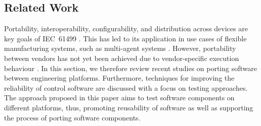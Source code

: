 \begin{bibunit}
\section{Related Work}
\label{sec::sota}

Portability, interoperability, configurability, and distribution across devices are key goals of IEC~61499 \cite{jhunjhunwala2024interoperability,hopsu2019portability, batchkova2013dynamic}. 
This has led to its application in use cases of flexible manufacturing systems, such as multi-agent systems \cite{lyu2023multi, xavier2024enhancing}. However, portability between vendors has not yet been achieved due to vendor-specific execution behaviour \cite{misperceptions}. In this section, we therefore review recent studies on porting software between engineering platforms. Furthermore, techniques for improving the reliability of control software are discussed with a focus on testing approaches. The approach proposed in this paper aims to test software components on different platforms, thus, promoting reusability of software as well as supporting the process of porting software components. 


\end{bibunit}
